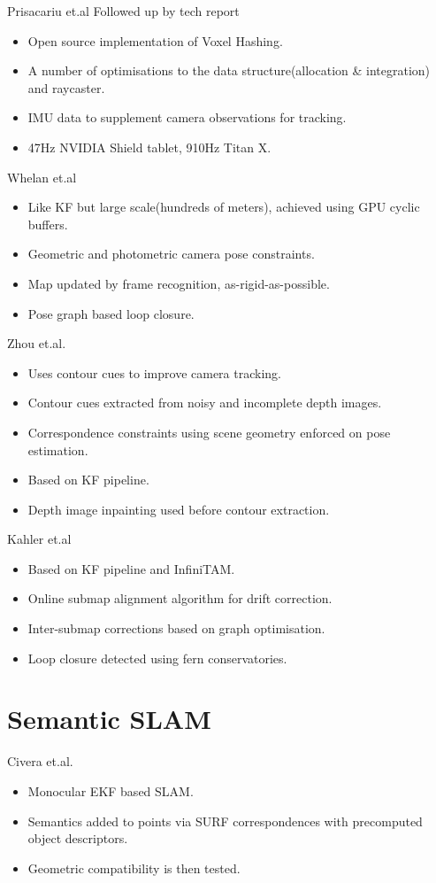 Prisacariu et.al \cite{Prisacariu2014} Followed up by tech report \cite{Kahler2015}
\begin{itemize}
	\item Open source implementation of Voxel Hashing.
	\item A number of optimisations to the data structure(allocation \& integration) and raycaster.
	\item IMU data to supplement camera observations for tracking.
	\item 47Hz NVIDIA Shield tablet, 910Hz Titan X.
\end{itemize}

Whelan et.al \cite{Whelan2015}
\begin{itemize}
	\item Like KF but large scale(hundreds of meters), achieved using GPU cyclic buffers.
	\item Geometric and photometric camera pose constraints.
	\item Map updated by frame recognition, as-rigid-as-possible. %
	\item Pose graph based loop closure.
\end{itemize}

Zhou et.al. \cite{Zhou2015}
\begin{itemize}
	\item Uses contour cues to improve camera tracking.
	\item Contour cues extracted from noisy and incomplete depth images.
	\item Correspondence constraints using scene geometry enforced on pose estimation.
	\item Based on KF pipeline.
	\item Depth image inpainting used before contour extraction.
\end{itemize}

Kahler et.al \cite{Kahler2016} 
\begin{itemize}
	\item Based on KF pipeline and InfiniTAM.
	\item Online submap alignment algorithm for drift correction.
	\item Inter-submap corrections based on graph optimisation.
	\item Loop closure detected using fern conservatories. %
\end{itemize}

\section{Semantic SLAM}
\label{sec:lit_review_semantic}
Civera et.al. \cite{Civera2011}
\begin{itemize}
	\item Monocular EKF based SLAM.
	\item Semantics added to points via SURF correspondences with precomputed object descriptors.
	\item Geometric compatibility is then tested.
\end{itemize}

